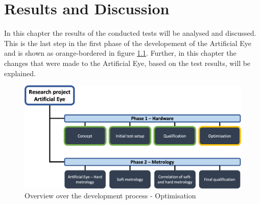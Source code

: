 \chapter{Results and Discussion}
\label{resultanddiscussion}
In this chapter the results of the conducted tests will be analysed and discussed. This is the last step in the first phase of the developement of the Artificial Eye and is shown as orange-bordered in figure \ref{ChainOpti}. Further, in this chapter the changes that were made to the Artificial Eye, based on the test results, will be explained. 

\begin{figure}[h]
\begin{center}
\includegraphics[width=12cm]{Pictures/ChainOpti}
\caption[Overview over the development process - Optimisation]{Overview over the development process - Optimisation}
\label{ChainOpti}
\end{center}
\end{figure}

